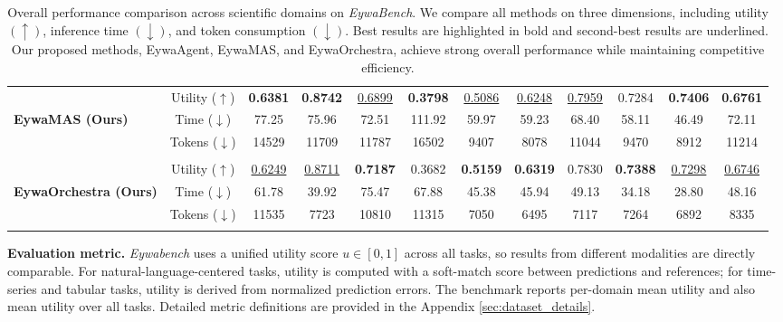 \documentclass{llmxive}
\begin{document}
{\begin{table}[!t]
{\begin{tabular}{l|c|ccc|ccc|ccc|c}
        \cellcolor{violet!7}
        & Utility ($\uparrow$)   & \textbf{0.6381} & \textbf{0.8742} & \underline{0.6899} & \textbf{0.3798} & \underline{0.5086} & \underline{0.6248} & \underline{0.7959} & 0.7284 & \textbf{0.7406} & \textbf{0.6761}\\
        \cellcolor{violet!7}\textbf{EywaMAS (Ours)}
        & Time ($\downarrow$)  & 77.25 & 75.96 & 72.51 & 111.92 & 59.97 & 59.23 & 68.40 & 58.11 & 46.49 & 72.11\\
        \cellcolor{violet!7}
        & Tokens ($\downarrow$) & 14529 & 11709 & 11787 & 16502 & 9407 & 8078 & 11044 & 9470 & 8912 & 11214\\
        
        \addlinespace[-0.4ex] \midrule \addlinespace[-0.000ex]
        \rowcolor{gray!16}
        \multicolumn{12}{c}{
            \rule{0pt}{1.1em}
            \textbf{\textit{Dynamic Orchestration}}
            \rule[-0.3em]{0pt}{1.1em}
        } \\
        [-0.4ex]\midrule\addlinespace[-0.000ex]

        \cellcolor{pink!7}
            & Utility ($\uparrow$)   & \underline{0.6249} & \underline{0.8711} & \textbf{0.7187} & 0.3682 & \textbf{0.5159} & \textbf{0.6319} & 0.7830 & \textbf{0.7388} & \underline{0.7298} & \underline{0.6746}\\
        \cellcolor{pink!7}\textbf{EywaOrchestra (Ours)}
            & Time ($\downarrow$)  & 61.78 & 39.92 & 75.47 & 67.88 & 45.38 & 45.94 & 49.13 & 34.18 & 28.80 & 48.16\\
        \cellcolor{pink!7}
            & Tokens ($\downarrow$) & 11535 & 7723 & 10810 & 11315 & 7050 & 6495 & 7117 & 7264 & 6892 & 8335\\
        [-0.4ex]\bottomrule\addlinespace[-0.000ex]

    \end{tabular}
    }
\caption{Overall performance comparison across scientific domains on \textit{EywaBench}. We compare all methods on three dimensions, including utility $(\uparrow)$, inference time $(\downarrow)$, and token consumption $(\downarrow)$. Best results are highlighted in bold and second-best results are underlined. Our proposed methods, EywaAgent, EywaMAS, and EywaOrchestra, achieve strong overall performance while maintaining competitive efficiency.}
\end{table}


\textbf{Evaluation metric.} \textit{Eywabench} uses a unified utility score $u \in [0,1]$ across all tasks, so results from different modalities are directly comparable.
For natural-language-centered tasks, utility is computed with a soft-match score between predictions and references; for time-series and tabular tasks, utility is derived from normalized prediction errors.
The benchmark reports per-domain mean utility and also mean utility over all tasks. Detailed metric definitions are provided in the Appendix \ref{sec:dataset_details}.

}
\end{document}
